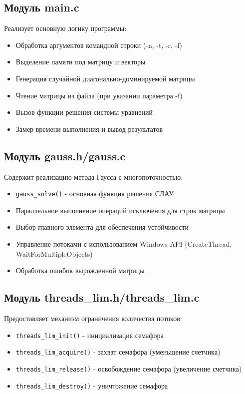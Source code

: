 \subsection{Модуль main.c}
Реализует основную логику программы:
\begin{itemize}
    \item Обработка аргументов командной строки (-n, -t, -r, -f)
    \item Выделение памяти под матрицу и векторы
    \item Генерация случайной диагонально-доминируемой матрицы
    \item Чтение матрицы из файла (при указании параметра -f)
    \item Вызов функции решения системы уравнений
    \item Замер времени выполнения и вывод результатов
\end{itemize}

\subsection{Модуль gauss.h/gauss.c}
Содержит реализацию метода Гаусса с многопоточностью:
\begin{itemize}
    \item \texttt{gauss\_solve()} - основная функция решения СЛАУ
    \item Параллельное выполнение операций исключения для строк матрицы
    \item Выбор главного элемента для обеспечения устойчивости
    \item Управление потоками с использованием Windows API (CreateThread, WaitForMultipleObjects)
    \item Обработка ошибок вырожденной матрицы
\end{itemize}

\subsection{Модуль threads\_lim.h/threads\_lim.c}
Предоставляет механизм ограничения количества потоков:
\begin{itemize}
    \item \texttt{threads\_lim\_init()} - инициализация семафора
    \item \texttt{threads\_lim\_acquire()} - захват семафора (уменьшение счетчика)
    \item \texttt{threads\_lim\_release()} - освобождение семафора (увеличение счетчика)
    \item \texttt{threads\_lim\_destroy()} - уничтожение семафора
\end{itemize}

